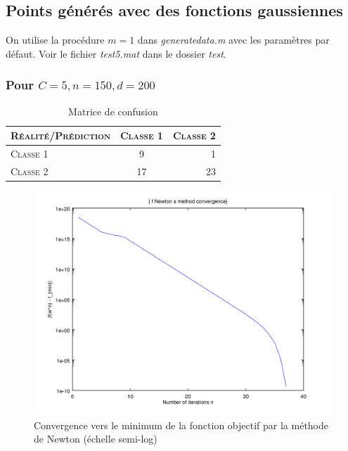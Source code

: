 \documentclass{article}
\begin{document}
\subsection{Points générés avec des fonctions gaussiennes}

On utilise la procédure $m=1$ dans \emph{generatedata.m} avec les paramètres par défaut. Voir le fichier \emph{test5.mat} dans le dossier \emph{test}.

\subsubsection{Pour $C=5, n=150, d=200$}

     \begin{table}[H]
       \caption{Matrice de confusion}
       \begin{tabular}{|l|c|r|}
         \hline
         \textsc{Réalité/Prédiction} & \textsc{Classe 1} & \textsc{Classe 2}\\
         \hline
         \textsc{Classe 1} & 9 & 1\\
         \hline
         \textsc{Classe 2} & 17 & 23\\
         \hline
       \end{tabular}
     \end{table}

         \begin{figure}
           \begin{center}
             \includegraphics[scale=0.5]{images/cvnewton5.png}
             \caption{Convergence vers le minimum de la fonction objectif par la méthode de Newton (échelle semi-log)}
           \end{center}
         \end{figure}
\end{document}
